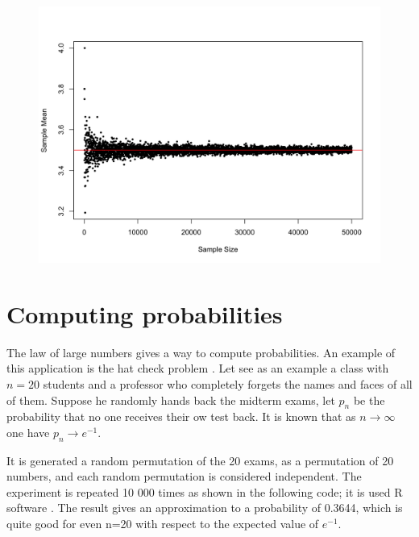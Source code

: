 \documentclass[10pt,leter,openany]{article}
\begin{document}
	\begin{figure}
	\begin{center}
		\includegraphics[scale=0.21]{img/die_plot}
		\label{fig:dieplot}
	\end{center}
\end{figure}



\section{Computing probabilities}

The law of large numbers gives a way to compute probabilities. An example of this application is the hat check problem \citep{scoville1966hat}. Let see as an example a class with $n = 20$ students and a professor who completely forgets the names and faces of all of them. Suppose he randomly hands back the midterm exams, let $p_{n}$ be the probability that no one receives their ow test back. It is known that as $n \rightarrow \infty$ one have $p_{n} \rightarrow e^{-1}$. 

It is generated a random permutation of the 20 exams, as a permutation of 20 numbers, and each random permutation is considered independent. The experiment is repeated 10 000 times as shown in the following code; it is used R software \citep{r}. The result gives an approximation to a probability of 0.3644, which is quite good for even n=20 with respect to the expected value of $e^{-1}$. 


\end{document}

